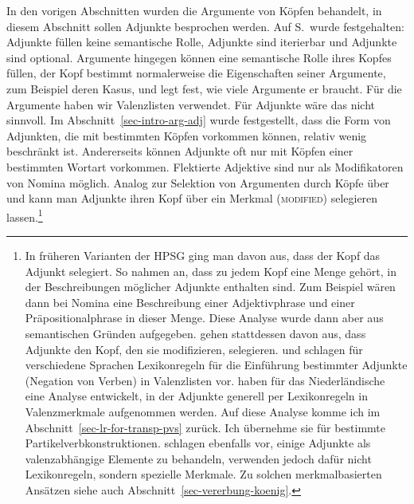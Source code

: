 In den vorigen Abschnitten wurden die Argumente von Köpfen behandelt, in diesem Abschnitt sollen
Adjunkte besprochen werden. Auf S.\,\pageref{adj-kriterien} wurde festgehalten: Adjunkte füllen keine semantische
Rolle, Adjunkte sind iterierbar und Adjunkte sind optional. Argumente hingegen können eine
semantische Rolle ihres Kopfes füllen, der Kopf bestimmt normalerweise die Eigenschaften seiner
Argumente, zum Beispiel deren Kasus, und legt fest, wie viele Argumente er braucht. Für die
Argumente haben wir Valenzlisten verwendet. Für Adjunkte wäre das nicht sinnvoll. Im
Abschnitt~\ref{sec-intro-arg-adj} wurde festgestellt, dass die Form
von Adjunkten, die mit bestimmten Köpfen vorkommen können, relativ wenig beschränkt ist. Andererseits
können Adjunkte oft nur mit Köpfen einer bestimmten Wortart vorkommen. Flektierte
Adjektive sind \zb nur als Modifikatoren von Nomina möglich. 
\eal
{}
\zl
Analog zur Selektion von Argumenten durch Köpfe über \spr und \comps kann
man Adjunkte ihren Kopf über ein Merkmal (\textsc{modified}) selegieren
lassen.\footnote{\label{fn-adjuncts-as-complements}%
  In früheren Varianten der HPSG ging man davon aus, dass der Kopf das Adjunkt selegiert. So nahmen
  \citet[161]{ps} an, dass zu jedem Kopf eine Menge gehört, in der Beschreibungen möglicher Adjunkte
  enthalten sind. Zum Beispiel wären dann bei Nomina eine Beschreibung einer Adjektivphrase und einer
  Präpositionalphrase in dieser Menge. Diese Analyse wurde dann aber aus semantischen Gründen
  aufgegeben. \citet[Abschnitt~1.9]{ps2} gehen stattdessen davon aus, dass
  Adjunkte den Kopf, den sie modifizieren,
  selegieren. \textcites[64]{Miller92d-u}[83]{Warner93a-u}[21]{AG97a-u}[60]{MSI99a}[103]{Kim2000a-u} und \citet[131]{Sag2020a}
  schlagen für verschiedene Sprachen Lexikonregeln für die Einführung bestimmter Adjunkte (\zb Negation von Verben) in Valenzlisten vor.
   haben für das Niederländische eine Analyse entwickelt, in der Adjunkte generell per
  Lexikonregeln in Valenzmerkmale aufgenommen werden. Auf diese Analyse komme ich im
  Abschnitt~\ref{sec-lr-for-transp-pvs} zurück. Ich übernehme sie für bestimmte
  Partikelverbkonstruktionen. \citet*[42]{BMS2001a} schlagen ebenfalls vor, einige Adjunkte als
  valenzabhängige Elemente zu behandeln, verwenden jedoch dafür nicht Lexikonregeln, sondern
  spezielle Merkmale. Zu solchen merkmalbasierten Ansätzen siehe auch Abschnitt~\ref{sec-vererbung-koenig}.%
}
